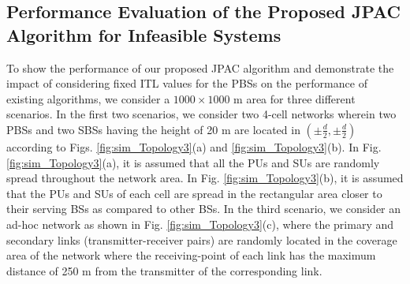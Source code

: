 \documentclass[journal,twoside]{IEEEtran}
\begin{document}
\subsection{Performance Evaluation of the Proposed JPAC Algorithm for Infeasible Systems}
	To show the performance of our proposed JPAC algorithm and demonstrate the impact of considering fixed  ITL values for the PBSs on the performance of existing algorithms, we consider a $1000\times 1000$ m area for three different scenarios. In the first two scenarios, we consider two 4-cell  networks wherein two PBSs and two SBSs having the height of 20 m are located in $(\pm \frac{d}{2}, \pm \frac{d}{2})$ according to Figs. \ref{fig:sim_Topology3}(a) and \ref{fig:sim_Topology3}(b). In Fig. \ref{fig:sim_Topology3}(a), it is assumed that all the PUs and SUs are randomly spread throughout the network area. In Fig. \ref{fig:sim_Topology3}(b), it is assumed that the PUs and SUs of each cell are spread in the rectangular area closer to their serving BSs as compared to other BSs. In the third scenario, we consider an ad-hoc network as shown in Fig. \ref{fig:sim_Topology3}(c), where the primary and secondary links (transmitter-receiver pairs) are randomly located in the coverage area of the network where the receiving-point of each link has the maximum distance of 250 m from the transmitter of the corresponding link.
\end{document}
